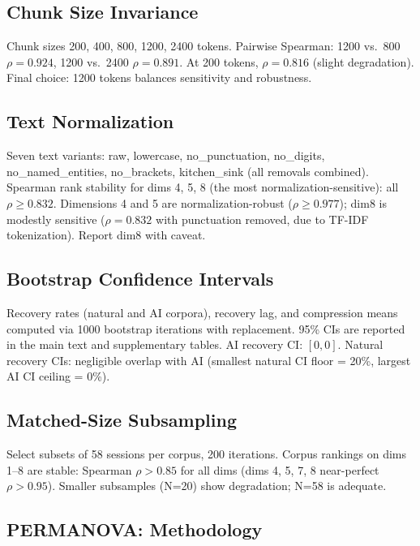 \documentclass[final]{clv2025}
\begin{document}
\subsection{Chunk Size Invariance}

Chunk sizes 200, 400, 800, 1200, 2400 tokens. Pairwise Spearman: 1200 vs.\ 800 $\rho = 0.924$, 1200 vs.\ 2400 $\rho = 0.891$. At 200 tokens, $\rho = 0.816$ (slight degradation). Final choice: 1200 tokens balances sensitivity and robustness.

\subsection{Text Normalization}

Seven text variants: raw, lowercase, no\_punctuation, no\_digits, no\_named\_entities, no\_brackets, kitchen\_sink (all removals combined). Spearman rank stability for dims 4, 5, 8 (the most normalization-sensitive): all $\rho \geq 0.832$. Dimensions 4 and 5 are normalization-robust ($\rho \geq 0.977$); dim8 is modestly sensitive ($\rho = 0.832$ with punctuation removed, due to TF-IDF tokenization). Report dim8 with caveat.

\subsection{Bootstrap Confidence Intervals}

Recovery rates (natural and AI corpora), recovery lag, and compression means computed via 1000 bootstrap iterations with replacement. 95\% CIs are reported in the main text and supplementary tables. AI recovery CI: $[0, 0]$. Natural recovery CIs: negligible overlap with AI (smallest natural CI floor = 20\%, largest AI CI ceiling = 0\%).

\subsection{Matched-Size Subsampling}

Select subsets of 58 sessions per corpus, 200 iterations. Corpus rankings on dims 1--8 are stable: Spearman $\rho > 0.85$ for all dims (dims 4, 5, 7, 8 near-perfect $\rho > 0.95$). Smaller subsamples (N=20) show degradation; N=58 is adequate.

\FloatBarrier


\subsection{PERMANOVA: Methodology}
\end{document}
